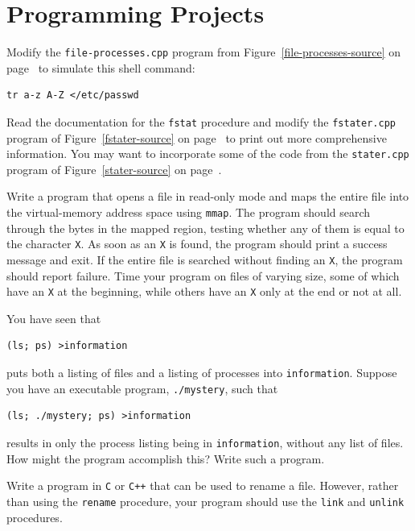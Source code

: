 \section*{Programming Projects}
\begin{chapterEnumerate}
\item Modify the {\tt file-processes.cpp} program from Figure~\ref{file-processes-source} on page~\pageref{file-processes-source} to
simulate this shell command:
\begin{verbatim}
tr a-z A-Z </etc/passwd
\end{verbatim}
\item
Read the documentation for the \verb|fstat| procedure and modify the
\verb|fstater.cpp| program of Figure~\ref{fstater-source} on
page~\pageref{fstater-source} to print out more comprehensive
information.   You may want to incorporate some of the code from the
\verb|stater.cpp| program of Figure~\ref{stater-source} on
page~\pageref{stater-source}.
\item
Write a program that opens a file in read-only mode and maps the
entire file into
the virtual-memory address space using \verb|mmap|.  The program should search
through the bytes in the mapped region, testing whether any of them is
equal to the character \verb|X|.  As soon as an \verb|X| is found,
the program should print a success message and exit.  If the entire file is searched
without finding an \verb|X|, the program should report failure.  Time your program on
files of varying size, some of which have an \verb|X| at the
beginning, while others have an \verb|X| only at the end or not at
all.
\item
You have seen that
\begin{verbatim}
(ls; ps) >information
\end{verbatim}
puts both a listing of files and a listing of processes into
\verb|information|.  Suppose you have an executable program,
\verb|./mystery|, such that
\begin{verbatim}
(ls; ./mystery; ps) >information
\end{verbatim}
results in only the process listing being in \verb|information|,
without any list of files.  How might the program accomplish this?
Write such a program.
\item
Write a program in \verb|C| or \verb|C++| that can be used to rename a
file.  However, rather than using the \verb|rename| procedure, your
program should use the \verb|link| and \verb|unlink| procedures.
\end{chapterEnumerate}

